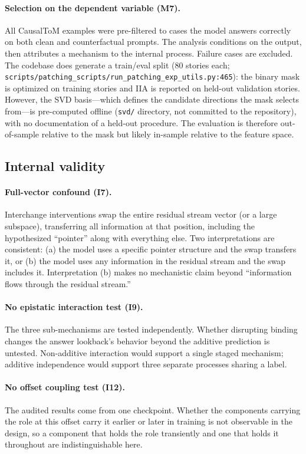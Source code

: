 \documentclass{article}
\begin{document}
\paragraph{Selection on the dependent variable (M7).}
All CausalToM examples were pre-filtered to cases the model answers correctly on both clean and counterfactual prompts. The analysis conditions on the output, then attributes a mechanism to the internal process. Failure cases are excluded. The codebase does generate a train/eval split (80 stories each; \texttt{scripts/patching\_scripts/run\_patching\_exp\_utils.py:465}): the binary mask is optimized on training stories and IIA is reported on held-out validation stories. However, the SVD basis---which defines the candidate directions the mask selects from---is pre-computed offline (\texttt{svd/} directory, not committed to the repository), with no documentation of a held-out procedure. The evaluation is therefore out-of-sample relative to the mask but likely in-sample relative to the feature space.

\subsection{Internal validity}

\paragraph{Full-vector confound (I7).}
Interchange interventions swap the entire residual stream vector (or a large subspace), transferring all information at that position, including the hypothesized ``pointer'' along with everything else. Two interpretations are consistent: (a) the model uses a specific pointer structure and the swap transfers it, or (b) the model uses any information in the residual stream and the swap includes it. Interpretation (b) makes no mechanistic claim beyond ``information flows through the residual stream.''

\paragraph{No epistatic interaction test (I9).}
The three sub-mechanisms are tested independently. Whether disrupting binding changes the answer lookback's behavior beyond the additive prediction is untested. Non-additive interaction would support a single staged mechanism; additive independence would support three separate processes sharing a label.

\paragraph{No offset coupling test (I12).}
The audited results come from one checkpoint. Whether the components carrying the role at
this offset carry it earlier or later in training is not observable in the design, so a
component that holds the role transiently and one that holds it throughout are
indistinguishable here.
\end{document}

